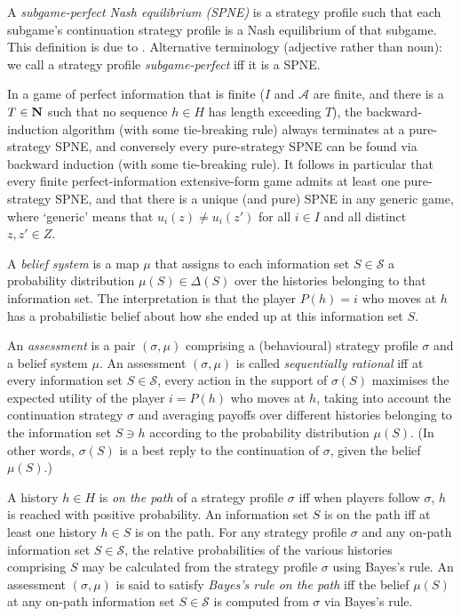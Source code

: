 \documentclass[11pt,letterpaper,reqno,oneside]{book}
\begin{document}
A \emph{subgame-perfect Nash equilibrium (SPNE)} is a strategy profile such that each subgame's continuation strategy profile is a Nash equilibrium of that subgame. This definition is due to \textcite{Selten1965}. Alternative terminology (adjective rather than noun): we call a strategy profile \emph{subgame-perfect} iff it is a SPNE.

In a game of perfect information that is finite ($I$ and $\mathcal{A}$ are finite, and there is a $T \in \mathbf{N}$ such that no sequence $h \in H$ has length exceeding $T$), the backward-induction algorithm (with some tie-breaking rule) always terminates at a pure-strategy SPNE, and conversely every pure-strategy SPNE can be found via backward induction (with some tie-breaking rule). It follows in particular that every finite perfect-information extensive-form game admits at least one pure-strategy SPNE, and that there is a unique (and pure) SPNE in any generic game, where `generic' means that $u_i(z) \neq u_i(z')$ for all $i \in I$ and all distinct $z,z' \in Z$.

A \emph{belief system} is a map $\mu$ that assigns to each information set $S \in \mathcal{S}$ a probability distribution $\mu(S) \in \Delta(S)$ over the histories belonging to that information set. The interpretation is that the player $P(h)=i$ who moves at $h$ has a probabilistic belief about how she ended up at this information set $S$.

An \emph{assessment} is a pair $(\sigma,\mu)$ comprising a (behavioural) strategy profile $\sigma$ and a belief system $\mu$. An assessment $(\sigma,\mu)$ is called \emph{sequentially rational} iff at every information set $S \in \mathcal{S}$, every action in the support of $\sigma(S)$ maximises the expected utility of the player $i = P(h)$ who moves at $h$, taking into account the continuation strategy $\sigma$ and averaging payoffs over different histories belonging to the information set $S \ni h$ according to the probability distribution $\mu(S)$. (In other words, $\sigma(S)$ is a best reply to the continuation of $\sigma$, given the belief $\mu(S)$.)

A history $h \in H$ is \emph{on the path} of a strategy profile $\sigma$ iff when players follow $\sigma$, $h$ is reached with positive probability. An information set $S$ is on the path iff at least one history $h \in S$ is on the path. For any strategy profile $\sigma$ and any on-path information set $S \in \mathcal{S}$, the relative probabilities of the various histories comprising $S$ may be calculated from the strategy profile $\sigma$ using Bayes's rule. An assessment $(\sigma,\mu)$ is said to satisfy \emph{Bayes's rule on the path} iff the belief $\mu(S)$ at any on-path information set $S \in \mathcal{S}$ is computed from $\sigma$ via Bayes's rule.
\end{document}
